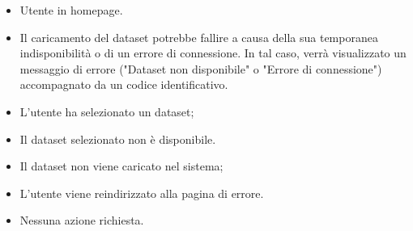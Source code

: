    \UCdsc
    { %
        \begin{itemize}
            \item Utente in homepage.
        \end{itemize}
    }
    { %
        \begin{itemize}
            \item Il caricamento del dataset potrebbe fallire a causa della sua
             temporanea indisponibilità o di un errore di connessione.
              In tal caso, verrà visualizzato un messaggio di errore ("Dataset non disponibile" o "Errore di connessione")
            accompagnato da un codice identificativo.
        \end{itemize}
    }
    { %
        \begin{itemize}
            \item L'utente ha selezionato un dataset;
            \item Il dataset selezionato non è disponibile.
        \end{itemize}
    }
    { %
        \begin{itemize}
            \item Il dataset non viene caricato nel sistema;
            \item L'utente viene reindirizzato alla pagina di errore.
        \end{itemize}
    }
    { %
        \begin{itemize}
            \item Nessuna azione richiesta.
        \end{itemize}
    }

\pagebreak

